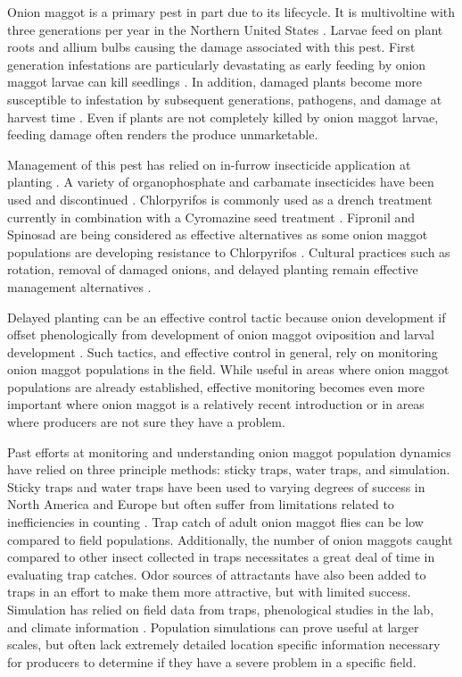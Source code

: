 \documentclass[alpha-refs]{wiley-article}
\begin{document}
Onion maggot is a primary pest in part due to its lifecycle.  It is multivoltine with three generations per year in the Northern United States \citep{eckenrode1975population, hoepting2004insecticide}.  Larvae feed on plant roots and allium bulbs causing the damage associated with this pest.  First generation infestations are particularly devastating as early feeding by onion maggot larvae can kill seedlings \citep{nault2006onion, nault2006performance}.  In addition, damaged plants become more susceptible to infestation by subsequent generations, pathogens, and damage at harvest time \citep{eckenrode1986impact,nault2006performance}.  Even if plants are not completely killed by onion maggot larvae, feeding damage often renders the produce unmarketable.  

Management of this pest has relied on in-furrow insecticide application at planting \citep{nault2006performance}.  A variety of organophosphate and carbamate insecticides have been used and discontinued \citep{nault2006performance}.  Chlorpyrifos is commonly used as a drench treatment currently in combination with a Cyromazine seed treatment \citep{nault2006performance}.  Fipronil and Spinosad are being considered as effective alternatives as some onion maggot populations are developing resistance to Chlorpyrifos \citep{nault2006onion}.  Cultural practices such as rotation, removal of damaged onions, and delayed planting remain effective management alternatives \citep{martinson1988dispersal, finch1985influence, nault2011delaying}.  

Delayed planting can be an effective control tactic because onion development if offset phenologically from development of onion maggot oviposition and larval development \citep{nault2011delaying}.  Such tactics, and effective control in general, rely on monitoring onion maggot populations in the field.  While useful in areas where onion maggot populations are already established, effective monitoring becomes even more important where onion maggot is a relatively recent introduction or in areas where producers are not sure they have a problem.  

Past efforts at monitoring and understanding onion maggot population dynamics have relied on three principle methods: sticky traps, water traps, and simulation.  Sticky traps and water traps have been used to varying degrees of success in North America and Europe but often suffer from limitations related to inefficiencies in counting \citep{thomingdeveloping,otto2000development}.  Trap catch of adult onion maggot flies can be low compared to field populations.  Additionally, the number of onion maggots caught compared to other insect collected in traps necessitates a great deal of time in evaluating trap catches.  Odor sources of attractants have also been added to traps in an effort to make them more attractive, but with limited success.  Simulation has relied on field data from traps, phenological studies in the lab, and climate information \citep{thomingdeveloping,otto2000development,ning2017predicting}.  Population simulations can prove useful at larger scales, but often lack extremely detailed location specific information necessary for producers to determine if they have a severe problem in a specific field.  
\end{document}
